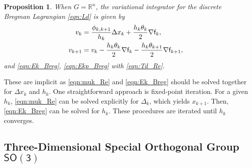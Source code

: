 \documentclass[letterpaper, 10pt, conference]{ieeeconf}
\newcommand{\SO}{\ensuremath{\mathsf{SO(3)}}}
\renewcommand{\Re}{\ensuremath{\mathbb{R}}}
\newtheorem{prop}{Proposition}
\begin{document}
\begin{prop}
    When $G=\Re^n$, the variational integrator for the discrete Bregman Lagrangian \eqref{eqn:Ld} is given by 
\begin{align}
    v_k & =  \frac{\phi_{k,k+1}}{h_k}\Delta x_k + \frac{h_k\theta_k}{2} \nabla \mathsf{f}_k,\label{eqn:muk_Re} \\
    v_{k+1} & = v_k - \frac{h_k\theta_k}{2} \nabla\mathsf{f}_k  -\frac{h_k\theta_{k+1}}{2} \nabla \mathsf{f}_{k+1},  \label{eqn:mukp_Re}
\end{align}
and \eqref{eqn:Ek_Breg}, \eqref{eqn:Ekp_Breg} with \eqref{eqn:Td_Re}.
\end{prop}
These are implicit as \eqref{eqn:muk_Re} and \eqref{eqn:Ek_Breg} should be solved together for $\Delta x_k$ and $h_k$.
One straightforward approach is fixed-point iteration.
For a given $h_k$, \eqref{eqn:muk_Re} can be solved explicitly for $\Delta_k$, which yields $x_{k+1}$. 
Then, \eqref{eqn:Ek_Breg} can be solved for $h_k$.
These procedures are iterated until $h_k$ converges. 

\subsection{Three-Dimensional Special Orthogonal Group $\SO$}
\end{document}
